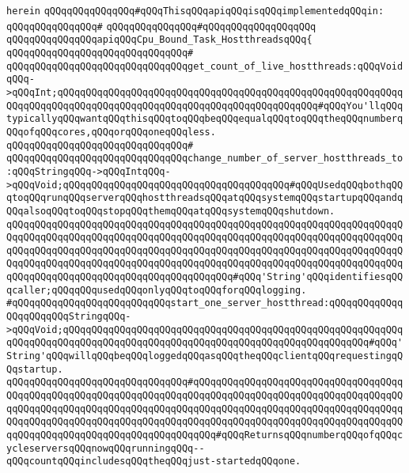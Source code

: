 \verb|herein|\newline
\newline
\verb|qQQqqQQqqQQqqQQq#qQQqThisqQQqapiqQQqisqQQqimplementedqQQqin:|\newline
\verb|qQQqqQQqqQQqqQQq#|\newline
\verb|qQQqqQQqqQQqqQQq#qQQqqQQqqQQqqQQqqQQq|\newline
\newline
\verb|qQQqqQQqqQQqqQQqapiqQQqCpu_Bound_Task_HostthreadsqQQq{|\newline
\verb|qQQqqQQqqQQqqQQqqQQqqQQqqQQqqQQq#|\newline
\verb|qQQqqQQqqQQqqQQqqQQqqQQqqQQqqQQqget_count_of_live_hostthreads:qQQqVoidqQQq->qQQqInt;qQQqqQQqqQQqqQQqqQQqqQQqqQQqqQQqqQQqqQQqqQQqqQQqqQQqqQQqqQQqqQQqqQQqqQQqqQQqqQQqqQQqqQQqqQQqqQQqqQQqqQQqqQQqqQQqqQQq#qQQqYou'llqQQqtypicallyqQQqwantqQQqthisqQQqtoqQQqbeqQQqequalqQQqtoqQQqtheqQQqnumberqQQqofqQQqcores,qQQqorqQQqoneqQQqless.|\newline
\verb|qQQqqQQqqQQqqQQqqQQqqQQqqQQqqQQq#|\newline
\verb|qQQqqQQqqQQqqQQqqQQqqQQqqQQqqQQqchange_number_of_server_hostthreads_to:qQQqStringqQQq->qQQqIntqQQq->qQQqVoid;qQQqqQQqqQQqqQQqqQQqqQQqqQQqqQQqqQQqqQQq#qQQqUsedqQQqbothqQQqtoqQQqrunqQQqserverqQQqhostthreadsqQQqatqQQqsystemqQQqstartupqQQqandqQQqalsoqQQqtoqQQqstopqQQqthemqQQqatqQQqsystemqQQqshutdown.|\newline
\verb|qQQqqQQqqQQqqQQqqQQqqQQqqQQqqQQqqQQqqQQqqQQqqQQqqQQqqQQqqQQqqQQqqQQqqQQqqQQqqQQqqQQqqQQqqQQqqQQqqQQqqQQqqQQqqQQqqQQqqQQqqQQqqQQqqQQqqQQqqQQqqQQqqQQqqQQqqQQqqQQqqQQqqQQqqQQqqQQqqQQqqQQqqQQqqQQqqQQqqQQqqQQqqQQqqQQqqQQqqQQqqQQqqQQqqQQqqQQqqQQqqQQqqQQqqQQqqQQqqQQqqQQqqQQqqQQqqQQqqQQqqQQqqQQqqQQqqQQqqQQqqQQqqQQqqQQqqQQqqQQq#qQQq'String'qQQqidentifiesqQQqcaller;qQQqqQQqusedqQQqonlyqQQqtoqQQqforqQQqlogging.|\newline
\newline
\verb|#qQQqqQQqqQQqqQQqqQQqqQQqqQQqstart_one_server_hostthread:qQQqqQQqqQQqqQQqqQQqqQQqStringqQQq->qQQqVoid;qQQqqQQqqQQqqQQqqQQqqQQqqQQqqQQqqQQqqQQqqQQqqQQqqQQqqQQqqQQqqQQqqQQqqQQqqQQqqQQqqQQqqQQqqQQqqQQqqQQqqQQqqQQqqQQqqQQqqQQqqQQq#qQQq'String'qQQqwillqQQqbeqQQqloggedqQQqasqQQqtheqQQqclientqQQqrequestingqQQqstartup.|\newline
\verb|qQQqqQQqqQQqqQQqqQQqqQQqqQQqqQQq#qQQqqQQqqQQqqQQqqQQqqQQqqQQqqQQqqQQqqQQqqQQqqQQqqQQqqQQqqQQqqQQqqQQqqQQqqQQqqQQqqQQqqQQqqQQqqQQqqQQqqQQqqQQqqQQqqQQqqQQqqQQqqQQqqQQqqQQqqQQqqQQqqQQqqQQqqQQqqQQqqQQqqQQqqQQqqQQqqQQqqQQqqQQqqQQqqQQqqQQqqQQqqQQqqQQqqQQqqQQqqQQqqQQqqQQqqQQqqQQqqQQqqQQqqQQqqQQqqQQqqQQqqQQqqQQqqQQqqQQqqQQq#qQQqReturnsqQQqnumberqQQqofqQQqcycleserversqQQqnowqQQqrunningqQQq--qQQqcountqQQqincludesqQQqtheqQQqjust-startedqQQqone.|\newline
